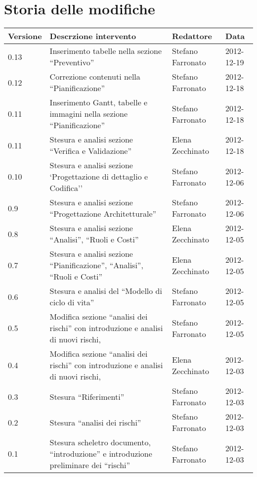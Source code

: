 \section*{Storia delle modifiche}
\begin{tabularx}{\textwidth}{lXll}
\toprule
Versione & Descrzione intervento & Redattore & Data\\
\midrule %
0.13 &Inserimento tabelle nella sezione ``Preventivo'' & Stefano Farronato & 2012-12-19\\
0.12 &Correzione contenuti nella ``Pianificazione'' & Stefano Farronato & 2012-12-18\\
0.11 &Inserimento Gantt, tabelle e immagini nella sezione ``Pianificazione'' & Stefano Farronato & 2012-12-18\\
0.11 &Stesura e analisi sezione ``Verifica e Validazione'' & Elena Zecchinato & 2012-12-18\\
0.10 &Stesura e analisi sezione `Progettazione di dettaglio e Codifica'' & Stefano Farronato & 2012-12-06\\
0.9 &Stesura e analisi sezione ``Progettazione Architetturale'' & Stefano Farronato & 2012-12-06\\
0.8 &Stesura e analisi sezione ``Analisi'', ``Ruoli e Costi'' & Elena Zecchinato & 2012-12-05\\
0.7 &Stesura e analisi sezione ``Pianificazione'', ``Analisi'', ``Ruoli e Costi'' & Elena Zecchinato & 2012-12-05\\
0.6 &Stesura e analisi del ``Modello di ciclo di vita'' & Stefano Farronato & 2012-12-05\\
0.5 &Modifica sezione ``analisi dei rischi'' con introduzione e analisi di nuovi rischi, & Stefano Farronato & 2012-12-05\\
0.4 & Modifica sezione ``analisi dei rischi'' con introduzione e analisi di nuovi rischi, & Elena Zecchinato & 2012-12-03\\
0.3 & Stesura ``Riferimenti'' & Stefano Farronato & 2012-12-03\\
0.2 & Stesura ``analisi dei rischi'' & Stefano Farronato & 2012-12-03\\
0.1 & Stesura scheletro documento, ``introduzione'' e introduzione preliminare dei ``rischi'' & Stefano Farronato & 2012-12-03\\
\bottomrule
\end{tabularx}
\newpage



